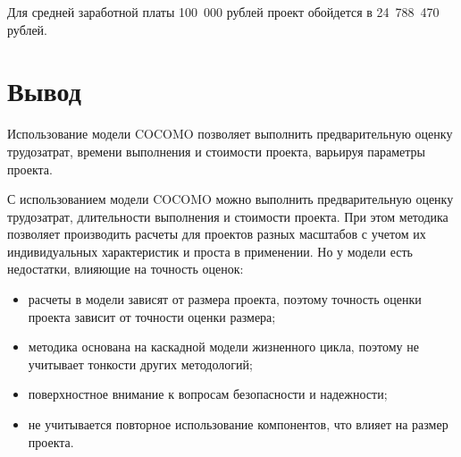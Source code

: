 Для средней заработной платы 100~000 рублей проект обойдется в 24~788~470 рублей.

\section*{Вывод}

Использование модели COCOMO позволяет выполнить предварительную оценку трудозатрат, времени выполнения и стоимости проекта, варьируя параметры проекта.

С использованием модели COCOMO можно выполнить предварительную оценку трудозатрат, длительности выполнения и стоимости проекта. При этом методика позволяет производить расчеты для проектов разных масштабов с учетом их индивидуальных характеристик и проста в применении. Но у модели есть недостатки, влияющие на точность оценок:

\begin{itemize}
	\item расчеты в модели зависят от размера проекта, поэтому точность оценки проекта зависит от точности оценки размера;
	\item методика основана на каскадной модели жизненного цикла, поэтому не учитывает тонкости других методологий;
	\item поверхностное внимание к вопросам безопасности и надежности;
	\item не учитывается повторное использование компонентов, что влияет на размер проекта.
\end{itemize}
